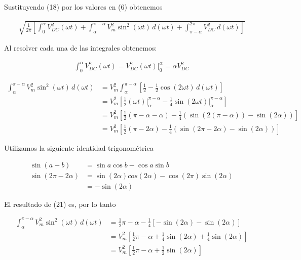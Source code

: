 \documentclass{article}
\begin{document}
\noindent Sustituyendo (18) por los valores en (6) obtenemos

\begin{align}
	\sqrt{\frac{1}{2\pi} \left[ \int_{0}^{\alpha}{V^2_{DC} (\omega t)} + \int_{\alpha}^{\pi - \alpha}{V^2_m \sin^2(\omega t) \, d(\omega t)}  + \int_{\pi - \alpha}^{2\pi}{V^2_{DC} \, d(\omega t)} \right]}
\end{align}

\noindent Al resolver cada una de las integrales obtenemos:

\begin{align}
	\int_{0}^{\alpha}{V^2_{DC} (\omega t)} = V^2_{DC} (\omega t)  \bigg\rvert_{0}^{\alpha} = \alpha V^2_{DC}
\end{align}

\begin{align}
	\int_{\alpha}^{\pi - \alpha}{V^2_m \sin^2(\omega t) \, d(\omega t)} &= V^2_m \int_{\alpha}^{\pi - \alpha}{ \left[  \frac{1}{2} - \frac{1}{2} \cos (2\omega t) \, d(\omega t)\right] } \nonumber \\
	&=V^2_m \left[ \frac{1}{2} (\omega t)\bigg\rvert_{\alpha}^{\pi - \alpha} - \frac{1}{4} \sin (2 \omega t)\bigg\rvert_{\alpha}^{\pi - \alpha}\right] \nonumber \\
	&= V^2_m \left[ \frac{1}{2} (\pi - \alpha - \alpha) - \frac{1}{4}(\sin(2(\pi - \alpha)) - \sin(2\alpha)) \right] \nonumber \\
	&= V^2_m \left[ \frac{1}{2}(\pi - 2\alpha) - \frac{1}{4}( \sin(2\pi - 2\alpha) - \sin ({2\alpha}) ) \right]
\end{align}

\noindent Utilizamos la siguiente identidad trigonométrica 

\begin{align}
	\sin(a - b) &= \sin a \cos b - \cos a \sin b \nonumber \\
	\sin(2\pi - 2\alpha) &= \sin(2\alpha)cos(2\alpha) - \cos(2\pi)\sin(2\alpha) \nonumber \\ 
	&= -\sin(2\alpha) \nonumber
\end{align}

\noindent El resultado de (21) es, por lo tanto

\begin{align}
	\int_{\alpha}^{\pi - \alpha}{V^2_m \sin^2(\omega t) \, d(\omega t)} &= \frac{1}{2}\pi - \alpha - \frac{1}{4}\left[ -\sin(2\alpha) - \sin(2\alpha) \right] \nonumber \\
	&= V^2_m \left[ \frac{1}{2}\pi - \alpha + \frac{1}{4}\sin (2\alpha) + \frac{1}{4}\sin (2\alpha) \right] \nonumber \\
	&= V^2_m \left[ \frac{1}{2}\pi - \alpha + \frac{1}{2} \sin(2 \alpha) \right]
\end{align}
\end{document}
